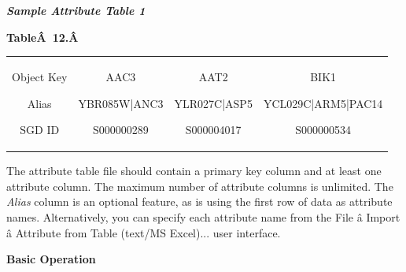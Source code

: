  \emph{\textbf{Sample Attribute Table 1} }

 \textbf{Table\^A 12.\^A }

\begin{tabular}{|c|c|c|c|}
\hline 
 & & & \\
\hline 

 Object Key


 Alias


 SGD ID
 &

 AAC3


 YBR085W|ANC3


 S000000289
 &

 AAT2


 YLR027C|ASP5


 S000004017
 &

 BIK1


 YCL029C|ARM5|PAC14


 S000000534
 \\
 \hline 

\end{tabular}

 The attribute table file should contain a primary key column and at least one attribute column. The maximum number of attribute columns is unlimited. The \emph{Alias}
 column is an optional feature, as is using the first row of data as attribute names. Alternatively, you can specify each attribute name from the File \^a Import \^a Attribute from Table (text/MS Excel)... user interface. 


 \textbf{Basic Operation}


